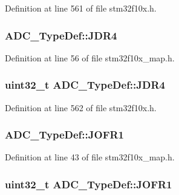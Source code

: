 Definition at line 561 of file stm32f10x.\+h.

\subsubsection[{\texorpdfstring{J\+D\+R4}{JDR4}}]{ A\+D\+C\+\_\+\+Type\+Def\+::\+J\+D\+R4}\hypertarget{struct_a_d_c___type_def_a4b0c3421a749e00b4643cd2ce0d26ba2}{}\label{struct_a_d_c___type_def_a4b0c3421a749e00b4643cd2ce0d26ba2}


Definition at line 56 of file stm32f10x\+\_\+map.\+h.

\subsubsection[{\texorpdfstring{J\+D\+R4}{JDR4}}]{ {\bf uint32\+\_\+t} A\+D\+C\+\_\+\+Type\+Def\+::\+J\+D\+R4}\hypertarget{struct_a_d_c___type_def_abae6e9d688b16ef350878998f5e21c0b}{}\label{struct_a_d_c___type_def_abae6e9d688b16ef350878998f5e21c0b}


Definition at line 562 of file stm32f10x.\+h.

\subsubsection[{\texorpdfstring{J\+O\+F\+R1}{JOFR1}}]{ A\+D\+C\+\_\+\+Type\+Def\+::\+J\+O\+F\+R1}\hypertarget{struct_a_d_c___type_def_a0b5d22c29cd9536d500b47325b433a3c}{}\label{struct_a_d_c___type_def_a0b5d22c29cd9536d500b47325b433a3c}


Definition at line 43 of file stm32f10x\+\_\+map.\+h.

\subsubsection[{\texorpdfstring{J\+O\+F\+R1}{JOFR1}}]{ {\bf uint32\+\_\+t} A\+D\+C\+\_\+\+Type\+Def\+::\+J\+O\+F\+R1}\hypertarget{struct_a_d_c___type_def_aa005e656f528aaad28d70d61c9db9b81}{}\label{struct_a_d_c___type_def_aa005e656f528aaad28d70d61c9db9b81}


